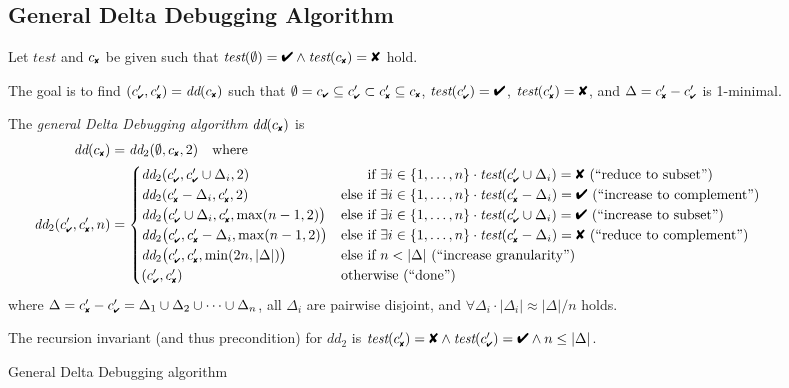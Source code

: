 \documentclass{acm_proc_article-sp}
\newcommand{\PASS}{\text{\ding{52}}\xspace}
\newcommand{\FAIL}{\text{\ding{56}}\xspace}
\newcommand{\cpass}{{c_{\scriptscriptstyle \PASS}}}
\newcommand{\cfail}{{c_{\scriptscriptstyle \FAIL}}}
\newcommand{\dpass}{{c'_{\scriptscriptstyle \PASS}}}
\newcommand{\dfail}{{c'_{\scriptscriptstyle \FAIL}}}
\newcommand{\dd}{\textit{dd}\xspace}
\newcommand{\test}{\textit{test}\xspace}
\theoremstyle{plain}
\begin{document}
\begin{figure*}[t]
\begin{boxedminipage}{\textwidth}
\subsection*{General Delta Debugging Algorithm}
\medskip

Let $\test$ and $\cfail$ be given such that $\test(\emptyset) = \PASS \land
\test(\cfail) = \FAIL$ hold.

The goal is to find $(\dpass, \dfail) = \dd(\cfail)$ such that $\emptyset =
\cpass \subseteq \dpass \subset \dfail \subseteq \cfail$, $\test(\dpass) = \PASS$,
$\test(\dfail) = \FAIL$, and $\Delta = \dfail - \dpass$ is 1-minimal.

The \emph{general Delta Debugging algorithm} $\dd(\cfail)$ is 
\begin{align*}
\dd(\cfail) &= \dd_2(\emptyset, \cfail, 2) \quad \text{where} \\
\dd_2(\dpass, \dfail, n) &= 
\begin{cases}
  \dd_2(\dpass, \dpass \cup \Delta_i, 2) & \text{\hphantom{else }if $\exists i \in \{1, \dots, n\} \cdot \test(\dpass \cup \Delta_i) = \FAIL$ (``reduce to subset'')} \\
  \dd_2(\dfail - \Delta_i, \dfail, 2) & \text{else if $\exists i \in \{1, \dots, n\} \cdot \test(\dfail - \Delta_i) = \PASS$ (``increase to complement'')} \\
  \dd_2\bigl(\dpass \cup \Delta_i, \dfail, \max(n - 1, 2)\bigr) & \text{else if $\exists i \in \{1, \dots, n\} \cdot \test(\dpass \cup \Delta_i) = \PASS$ (``increase to subset'')} \\
  \dd_2\bigl(\dpass, \dfail - \Delta_i, \max(n - 1, 2)\bigr) & \text{else if $\exists i \in \{1, \dots, n\} \cdot \test(\dfail - \Delta_i) = \FAIL$ (``reduce to complement'')} \\
  \dd_2\bigl(\dpass, \dfail, \min(2n, |\Delta|)\bigr) & \text{else if $n < |\Delta|$  (``increase granularity'')} \\
  (\dpass, \dfail) & \text{otherwise (``done'')}
\end{cases}
\end{align*}
where $\Delta = \dfail - \dpass = \Delta_1 \cup \Delta_2 \cup \dots \cup \Delta_n$, all $\Delta_i$ are
pairwise disjoint, and $\forall \Delta_i \cdot |\Delta_i| \approx |\Delta| / n$ holds.

The recursion invariant (and thus precondition) for $\dd_2$ is 
$\test(\dfail) = \FAIL \land \test(\dpass) = \PASS \land n \leq |\Delta|$.
\end{boxedminipage}
\caption{General Delta Debugging algorithm}
\label{fig:dd}
\end{figure*}
\end{document}
